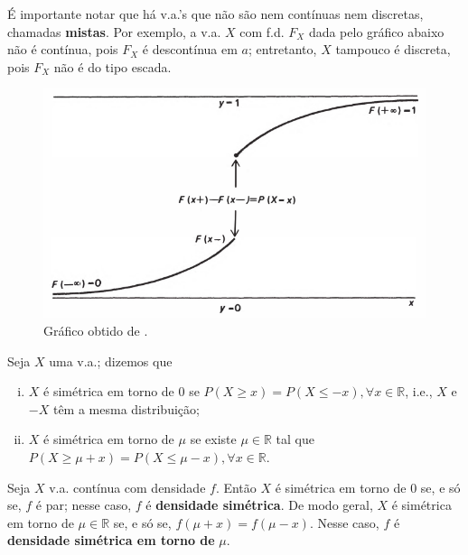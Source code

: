 \documentclass[../Notas.tex]{subfiles}
\begin{document}
\begin{remark}
É importante notar que há v.a.'s que não são nem contínuas nem discretas, chamadas \textbf{mistas}. Por exemplo, a v.a. $X$ com f.d. $F_X$ dada pelo gráfico abaixo não é contínua, pois $F_X$ é descontínua em $a$; entretanto, $X$ tampouco é discreta, pois $F_X$ não é do tipo escada.
\begin{figure}[H]
    \centering
    \includegraphics[width=\textwidth]{Imagens/p106-1.png}
    \caption{Gráfico obtido de \cite{Hoel}.}
\end{figure}
\end{remark}

\begin{definition}
Seja $X$ uma v.a.; dizemos que
\begin{enumerate}[(i)]
    \item $X$ é simétrica em torno de 0 se $P(X\geq x) = P(X\leq -x), \forall x\in\mathbb{R}$, i.e., $X$ e $-X$ têm a mesma distribuição;
    \item $X$ é simétrica em torno de $\mu$ se existe $\mu\in\mathbb{R}$ tal que $P(X\geq \mu + x) = P(X\leq \mu - x), \forall x\in\mathbb{R}$.
\end{enumerate}
\end{definition}

\begin{theorem}
Seja $X$ v.a. contínua com densidade $f$. Então $X$ é simétrica em torno de 0 se, e só se, $f$ é par; nesse caso, $f$ é \textbf{densidade simétrica}. De modo geral, $X$ é simétrica em torno de $\mu\in\mathbb{R}$ se, e só se, $f(\mu + x) = f(\mu - x)$. Nesse caso, $f$ é \textbf{densidade simétrica em torno de} $\mu$.
\end{theorem}
\end{document}
